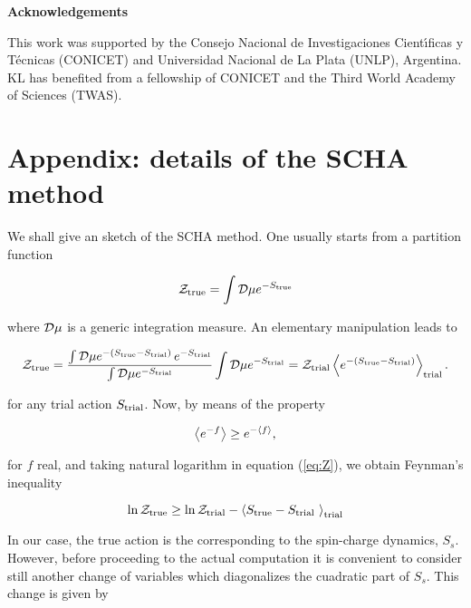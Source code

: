 \documentclass[a4paper,a4paper]{article}
\begin{document}
{\bf Acknowledgements}

This work was supported by the Consejo Nacional de Investigaciones Cient\'{\i}ficas y
T\'ecnicas (CONICET) and Universidad Nacional de La Plata (UNLP), Argentina. KL has
benefited from a fellowship of CONICET and the Third World Academy of Sciences (TWAS).

\section{Appendix: details of the SCHA method}

We shall give an sketch of the SCHA method. One usually starts from a partition
function

\begin{equation}
\mathcal{Z}_{\text{true}}=\int\mathcal{D}\mu e^{-S_{\text{true}}}
\end{equation}

\noindent where $\mathcal{D}\mu$ is a generic integration measure. An elementary manipulation
leads to

\begin{equation}\label{eq:Z}
\mathcal{Z}_{\text{true}}=\frac{\int\mathcal{D}\mu e^{-(S_{\text{true}}-S_{\text{trial}})}\,e^{-S_{\text{trial}}}}{\int\mathcal{D}\mu
e^{-S_{\text{trial}}}}\int\mathcal{D}\mu e^{-S_{\text{trial}}}=\mathcal{Z}_{\text{trial}}\left\langle e^{-(S_{\text{true}}-S_{\text{trial}})}
\right\rangle_{\text{trial}}.
\end{equation}

\noindent for any trial action $S_{\text{trial}}$. Now, by means of the property

\begin{equation}
\left\langle e^{-f} \right\rangle\geq e^{-\left\langle f \right\rangle},
\end{equation}

\noindent for $f$ real, and taking natural logarithm in equation (\ref{eq:Z}), we
obtain Feynman's inequality \cite{Feynman}

\begin{equation}\label{eq:Feynman}
\ln\Z\true\geq \ln\Z\trial - \bra S\true-S\trial\ \ket\trial
\end{equation}

In our case, the true action is the corresponding to the spin-charge dynamics, $S_s$.
However, before proceeding to the actual computation it is convenient to consider
still another change of variables which diagonalizes the cuadratic part of $S_s$. This
change is given by
\end{document}
